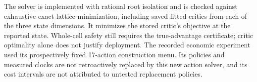 The solver is implemented with rational root isolation and is checked against exhaustive exact lattice minimization, including saved fitted critics from each of the three state dimensions. It minimizes the stored critic's objective at the reported state. Whole-cell safety still requires the true-advantage certificate; critic optimality alone does not justify deployment. The recorded economic experiment used its prospectively fixed 17-action construction menu. Its policies and measured clocks are not retroactively replaced by this new action solver, and its cost intervals are not attributed to untested replacement policies.
